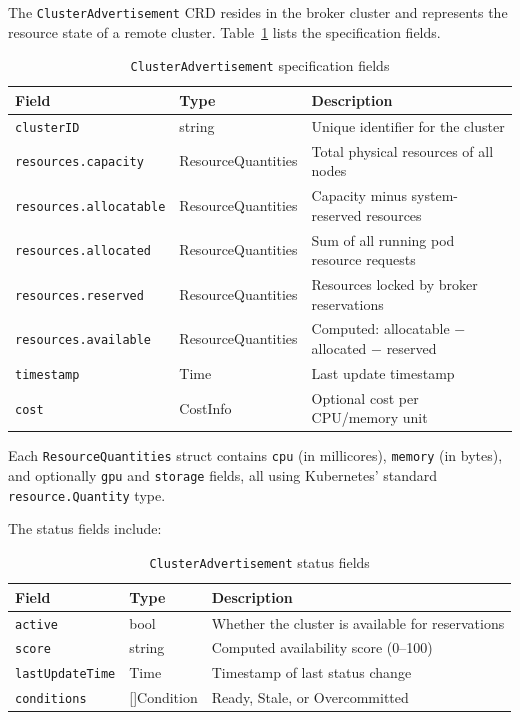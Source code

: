 The \texttt{ClusterAdvertisement} CRD resides in the broker cluster and represents the resource state of a remote cluster. Table~\ref{tab:cluster-adv} lists the specification fields.

\begin{table}[htbp]
\centering
\caption{\texttt{ClusterAdvertisement} specification fields}
\label{tab:cluster-adv}
\begin{tabular}{@{}llp{7cm}@{}}
\toprule
\textbf{Field} & \textbf{Type} & \textbf{Description} \\
\midrule
\texttt{clusterID} & string & Unique identifier for the cluster \\
\texttt{resources.capacity} & ResourceQuantities & Total physical resources of all nodes \\
\texttt{resources.allocatable} & ResourceQuantities & Capacity minus system-reserved resources \\
\texttt{resources.allocated} & ResourceQuantities & Sum of all running pod resource requests \\
\texttt{resources.reserved} & ResourceQuantities & Resources locked by broker reservations \\
\texttt{resources.available} & ResourceQuantities & Computed: allocatable $-$ allocated $-$ reserved \\
\texttt{timestamp} & Time & Last update timestamp \\
\texttt{cost} & CostInfo & Optional cost per CPU/memory unit \\
\bottomrule
\end{tabular}
\end{table}

Each \texttt{ResourceQuantities} struct contains \texttt{cpu} (in millicores), \texttt{memory} (in bytes), and optionally \texttt{gpu} and \texttt{storage} fields, all using Kubernetes' standard \texttt{resource.Quantity} type.

The status fields include:

\begin{table}[htbp]
\centering
\caption{\texttt{ClusterAdvertisement} status fields}
\label{tab:cluster-adv-status}
\begin{tabular}{@{}llp{7cm}@{}}
\toprule
\textbf{Field} & \textbf{Type} & \textbf{Description} \\
\midrule
\texttt{active} & bool & Whether the cluster is available for reservations \\
\texttt{score} & string & Computed availability score (0--100) \\
\texttt{lastUpdateTime} & Time & Timestamp of last status change \\
\texttt{conditions} & []Condition & Ready, Stale, or Overcommitted \\
\bottomrule
\end{tabular}
\end{table}

